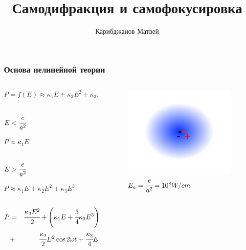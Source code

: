 \documentclass[handout]{beamer}
\title{Самодифракция и самофокусировка}
\author{Карибджанов Матвей}
\newcommand{\inner}[1]{\left( #1 \right)}
\begin{document}
\begin{frame}%
    \titlepage
\end{frame}

\begin{frame}
    \frametitle{Основа нелинейной теории}
    \begin{columns}
        \begin{column}{0.5\textwidth}
            \begin{equation*}
                P = f\inner{E} \approx \kappa_1 E + \kappa_2 E^2 + \kappa_3 E^3 + o(E^4)
            \end{equation*}

            \begin{column}{0.35\textwidth}
                $E < \cfrac{e}{a^2}$

                $P \approx \kappa_1 E$
            \end{column}
            \begin{column}{0.65\textwidth}
                $E > \cfrac{e}{a^2}$

                $P \approx \kappa_1 E + \kappa_2 E^2 + \kappa_3 E^3$
            \end{column}

            \begin{eqnarray*}
                P & = & \cfrac{\kappa_2 E^2}{2} + 
                \inner{\kappa_1 E + \cfrac{3}{4} \kappa_3 E^3} \cos{\omega t} + \\ 
                & + & \cfrac{\kappa_2}{2}E^2\cos 2\omega t + \cfrac{\kappa_3}{4}E^3 \cos 3\omega t  
            \end{eqnarray*}            
        \end{column}

        \begin{column}{0.4\textwidth}
            \begin{figure}[h]
                \centering
                \includegraphics[width=1\textwidth]{polar.jpg}
                \caption{$E_a = \cfrac{e}{a^2} = 10^8 W/cm$}
            \end{figure}
        \end{column}


\end{columns}
\end{frame}
\end{document}
